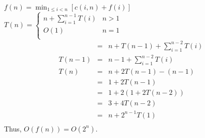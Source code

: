 
  \item $f(n) = \min_{1 \le i < n} [c(i, n) + f(i)]$\\
  $T(n) = \left \{
     \begin{array}{lr}
       n + \displaystyle\sum\limits_{i=1}^{n-1} T(i) & n > 1\\
       O(1) & n = 1\\
     \end{array}
   \right.
   $
  \begin{eqnarray*}
  &=& n + T(n-1) + \displaystyle\sum\limits_{i=1}^{n-2} T(i)\\
  T(n-1) &=& n - 1 + \displaystyle\sum\limits_{i=1}^{n-2} T(i)\\
  T(n) &=& n + 2T(n-1) - (n-1)\\
  &=& 1 + 2T(n-1)\\
  &=& 1 + 2(1 + 2T(n-2))\\
  &=& 3 + 4T(n-2)\\
  &=& n + 2^{n-1} T(1)\\
  \end{eqnarray*}
  Thus, $O(f(n)) = O(2^n)$.
